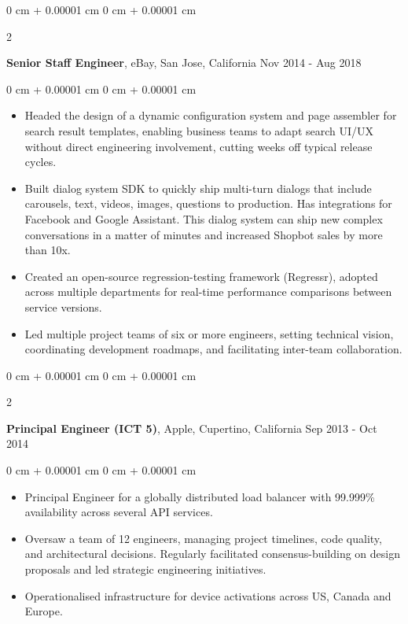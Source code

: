 \documentclass[10pt, letterpaper]{article}
\newenvironment{highlights}{
    \begin{itemize}[
        topsep=0.20 cm,     %
        parsep=0.20 cm,     %
        partopsep=0pt,
        itemsep=0.15cm,     %
        leftmargin=0 cm + 10pt
    ]
}{
    \end{itemize}
} %
\newenvironment{onecolentry}{
    \begin{adjustwidth}{
        0 cm + 0.00001 cm
    }{
        0 cm + 0.00001 cm
    }
}{
    \end{adjustwidth}
} %
\newenvironment{twocolentry}[2][]{
    \onecolentry
    \def\secondColumn{#2}
    \setcolumnwidth{\fill, 4.5 cm}
    \begin{paracol}{2}
}{
    \switchcolumn \raggedleft \secondColumn
    \end{paracol}
    \endonecolentry
} %
\begin{document}
        \vspace{0.35 cm} %
        \begin{twocolentry}{
            Nov 2014 - Aug 2018
        }
            \textbf{Senior Staff Engineer}, eBay, San Jose, California\end{twocolentry}
        \vspace{0.20 cm} %
        \begin{onecolentry}
            \begin{highlights}
                \item Headed the design of a dynamic configuration system and page assembler for search result templates, enabling business teams to adapt search UI/UX without direct engineering involvement, cutting weeks off typical release cycles.
                \item Built dialog system SDK to quickly ship multi-turn dialogs that include carousels, text, videos, images, questions to production. Has integrations for Facebook and Google Assistant. This dialog system can ship new complex conversations in a matter of minutes and increased Shopbot sales by more than 10x.
                \item Created an open-source regression-testing framework (Regressr), adopted across multiple departments for real-time performance comparisons between service versions.
                \item Led multiple project teams of six or more engineers, setting technical vision, coordinating development roadmaps, and facilitating inter-team collaboration.
            \end{highlights}
        \end{onecolentry}

        \vspace{0.35 cm} %
        \begin{twocolentry}{
            Sep 2013 - Oct 2014
        }
            \textbf{Principal Engineer (ICT 5)}, Apple, Cupertino, California\end{twocolentry}
        \vspace{0.20 cm} %
        \begin{onecolentry}
            \begin{highlights}
                \item Principal Engineer for a globally distributed load balancer with 99.999\% availability across several API services.
                \item Oversaw a team of 12 engineers, managing project timelines, code quality, and architectural decisions. Regularly facilitated consensus-building on design proposals and led strategic engineering initiatives.
                \item Operationalised infrastructure for device activations across US, Canada and Europe.
            \end{highlights}
        \end{onecolentry}
\end{document}
